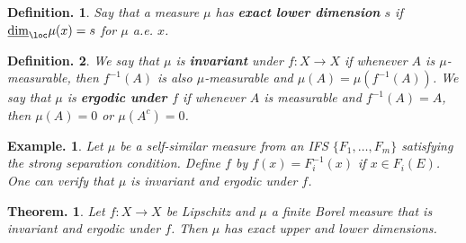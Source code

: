 \documentclass[11pt, a4paper]{memoir}
\theoremstyle{change}
\newtheorem{theorem}{Theorem.}[section]
\theoremstyle{plain}
\theoremstyle{nonumberplain}
\newtheorem{definition}{Definition.}
\newtheorem{example}{Example.}
\newcommand{\defn}[1]{{\boldmath\bfseries #1}}
\numberwithin{equation}{section}
\begin{document}
\begin{definition}
    Say that a measure $\mu$ has \defn{exact lower dimension} $s$ if $\underline{\dim}_{\loc}\mu(x)=s$ for $\mu$ a.e. $x$.
\end{definition}
\begin{definition}
    We say that $\mu$ is \defn{invariant} under $f:X\to X$ if whenever $A$ is $\mu$-measurable, then $f^{-1}(A)$ is also $\mu$-measurable and $\mu(A)=\mu(f^{-1}(A))$.
    We say that $\mu$ is \defn{ergodic under $f$} if whenever $A$ is measurable and $f^{-1}(A)=A$, then $\mu(A)=0$ or $\mu(A^c)=0$.
\end{definition}
\begin{example}
    Let $\mu$ be a self-similar measure from an IFS $\{F_1,\ldots,F_m\}$ satisfying the strong separation condition.
    Define $f$ by $f(x)=F_i^{-1}(x)$ if $x\in F_i(E)$.
    One can verify that $\mu$ is invariant and ergodic under $f$.
\end{example}
\begin{theorem}
    Let $f:X\to X$ be Lipschitz and $\mu$ a finite Borel measure that is invariant and ergodic under $f$.
    Then $\mu$ has exact upper and lower dimensions.
\end{theorem}
\end{document}
